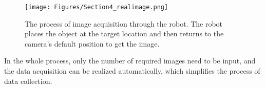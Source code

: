\begin{figure}[h]
	\texttt{[image: Figures/Section4\_realimage.png]} 
	\centering
	\caption{The process of image acquisition through the robot. The robot places the object at the target location and then returns to the camera's default position to get the image.}
	\label{fig:realimage}
\end{figure}


In the whole process, only the number of required images need to be input, and the data acquisition can be realized automatically, which simplifies the process of data collection.



